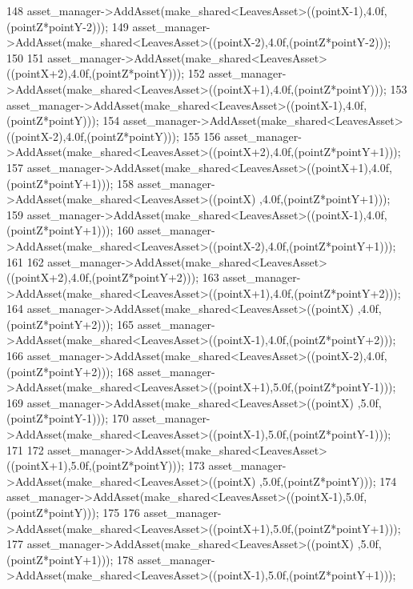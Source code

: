 \begin{DoxyCode}
148             asset\_manager->AddAsset(make\_shared<LeavesAsset>((pointX-1),4.0f,(pointZ*pointY-2)));
149             asset\_manager->AddAsset(make\_shared<LeavesAsset>((pointX-2),4.0f,(pointZ*pointY-2)));
150  
151             asset\_manager->AddAsset(make\_shared<LeavesAsset>((pointX+2),4.0f,(pointZ*pointY)));
152             asset\_manager->AddAsset(make\_shared<LeavesAsset>((pointX+1),4.0f,(pointZ*pointY)));
153             asset\_manager->AddAsset(make\_shared<LeavesAsset>((pointX-1),4.0f,(pointZ*pointY)));
154             asset\_manager->AddAsset(make\_shared<LeavesAsset>((pointX-2),4.0f,(pointZ*pointY)));
155  
156             asset\_manager->AddAsset(make\_shared<LeavesAsset>((pointX+2),4.0f,(pointZ*pointY+1)));
157             asset\_manager->AddAsset(make\_shared<LeavesAsset>((pointX+1),4.0f,(pointZ*pointY+1)));
158             asset\_manager->AddAsset(make\_shared<LeavesAsset>((pointX)  ,4.0f,(pointZ*pointY+1)));
159             asset\_manager->AddAsset(make\_shared<LeavesAsset>((pointX-1),4.0f,(pointZ*pointY+1)));
160             asset\_manager->AddAsset(make\_shared<LeavesAsset>((pointX-2),4.0f,(pointZ*pointY+1)));
161 
162             asset\_manager->AddAsset(make\_shared<LeavesAsset>((pointX+2),4.0f,(pointZ*pointY+2)));
163             asset\_manager->AddAsset(make\_shared<LeavesAsset>((pointX+1),4.0f,(pointZ*pointY+2)));
164             asset\_manager->AddAsset(make\_shared<LeavesAsset>((pointX)  ,4.0f,(pointZ*pointY+2)));
165             asset\_manager->AddAsset(make\_shared<LeavesAsset>((pointX-1),4.0f,(pointZ*pointY+2)));
166             asset\_manager->AddAsset(make\_shared<LeavesAsset>((pointX-2),4.0f,(pointZ*pointY+2)));
168             asset\_manager->AddAsset(make\_shared<LeavesAsset>((pointX+1),5.0f,(pointZ*pointY-1)));
169             asset\_manager->AddAsset(make\_shared<LeavesAsset>((pointX)  ,5.0f,(pointZ*pointY-1)));
170             asset\_manager->AddAsset(make\_shared<LeavesAsset>((pointX-1),5.0f,(pointZ*pointY-1))); 
171 
172             asset\_manager->AddAsset(make\_shared<LeavesAsset>((pointX+1),5.0f,(pointZ*pointY)));
173             asset\_manager->AddAsset(make\_shared<LeavesAsset>((pointX)  ,5.0f,(pointZ*pointY)));
174             asset\_manager->AddAsset(make\_shared<LeavesAsset>((pointX-1),5.0f,(pointZ*pointY)));
175  
176             asset\_manager->AddAsset(make\_shared<LeavesAsset>((pointX+1),5.0f,(pointZ*pointY+1)));
177             asset\_manager->AddAsset(make\_shared<LeavesAsset>((pointX)  ,5.0f,(pointZ*pointY+1)));
178             asset\_manager->AddAsset(make\_shared<LeavesAsset>((pointX-1),5.0f,(pointZ*pointY+1)));

\end{DoxyCode}
